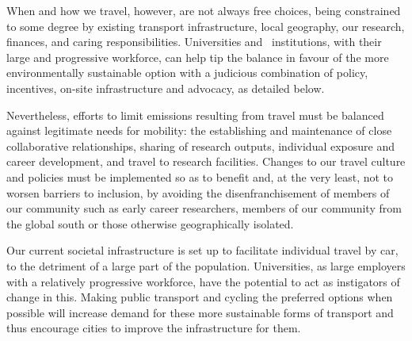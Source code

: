 \documentclass[../SustainableHEP.tex]{subfiles}
\begin{document}
When and how we travel, however, are not always free choices, being constrained to some degree by existing transport infrastructure, local geography, our research, finances, and caring responsibilities.  
Universities and \ACR\ institutions, with their large and progressive workforce, can help tip the balance in favour of the more environmentally sustainable option with a judicious combination of policy, incentives, on-site infrastructure and advocacy, as detailed below.

Nevertheless, efforts to limit emissions resulting from travel must be balanced against legitimate needs for mobility: the establishing and maintenance of close collaborative relationships, sharing of research outputs, individual exposure and career development, and travel to research facilities. 
Changes to our travel culture and policies must be implemented so as to benefit and, at the very least, not to worsen barriers to inclusion, by avoiding the disenfranchisement of members of our community such as early career researchers, members of our community from the global south or those otherwise geographically isolated. 

Our current societal infrastructure is set up to facilitate individual travel by car, to the detriment of a large part of the population. Universities, as large employers with a relatively progressive workforce, have the potential to act as instigators of change in this. Making public transport and cycling the preferred options when possible will increase demand for these more sustainable forms of transport and thus encourage cities to improve the infrastructure for them.
\end{document}

